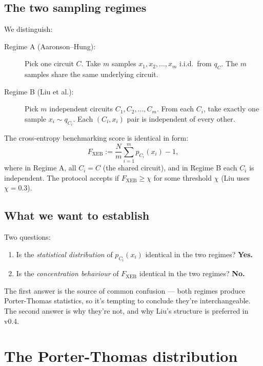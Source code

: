 \documentclass[11pt]{article}
\theoremstyle{definition}
\theoremstyle{remark}
\begin{document}
\subsection{The two sampling regimes}

We distinguish:

\begin{description}
\item[Regime A (Aaronson--Hung):] Pick one circuit $C$. Take $m$ samples
  $x_1, x_2, \ldots, x_m$ i.i.d.\ from $q_C$. The $m$ samples share the same
  underlying circuit.
\item[Regime B (Liu et al.):] Pick $m$ independent circuits $C_1, C_2,
  \ldots, C_m$. From each $C_i$, take exactly one sample $x_i \sim
  q_{C_i}$. Each $(C_i, x_i)$ pair is independent of every other.
\end{description}

The cross-entropy benchmarking score is identical in form:
\begin{equation}
  F_{\mathrm{XEB}} := \frac{N}{m} \sum_{i=1}^{m} p_{C_i}(x_i) - 1,
  \label{eq:fxeb}
\end{equation}
where in Regime A, all $C_i = C$ (the shared circuit), and in Regime B
each $C_i$ is independent. The protocol accepts if $F_{\mathrm{XEB}} \geq
\chi$ for some threshold $\chi$ (Liu uses $\chi = 0.3$).

\subsection{What we want to establish}

Two questions:
\begin{enumerate}[label=(\arabic*)]
\item Is the \emph{statistical distribution} of $p_{C_i}(x_i)$ identical in
  the two regimes? \textbf{Yes.}
\item Is the \emph{concentration behaviour} of $F_{\mathrm{XEB}}$ identical
  in the two regimes? \textbf{No.}
\end{enumerate}

The first answer is the source of common confusion --- both regimes
produce Porter-Thomas statistics, so it's tempting to conclude they're
interchangeable. The second answer is why they're not, and why Liu's
structure is preferred in v0.4.

\section{The Porter-Thomas distribution}
\label{sec:pt}
\end{document}
